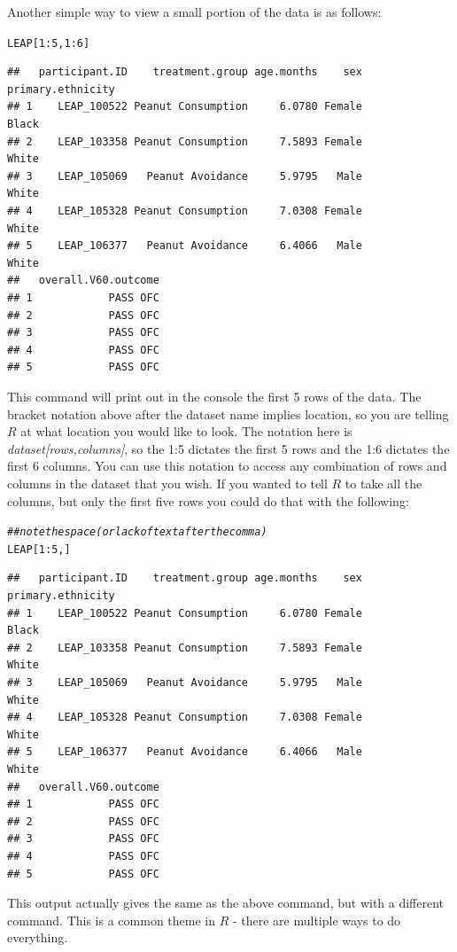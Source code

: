 \documentclass[11pt]{article}\usepackage[]{graphicx}\usepackage[]{color}
\makeatletter
\newcommand{\hlnum}[1]{\textcolor[rgb]{0.686,0.059,0.569}{#1}}%
\newcommand{\hlcom}[1]{\textcolor[rgb]{0.678,0.584,0.686}{\textit{#1}}}%
\newcommand{\hlopt}[1]{\textcolor[rgb]{0,0,0}{#1}}%
\newcommand{\hlstd}[1]{\textcolor[rgb]{0.345,0.345,0.345}{#1}}%
\newenvironment{kframe}{%
 \def\at@end@of@kframe{}%
 \ifinner\ifhmode%
  \def\at@end@of@kframe{\end{minipage}}%
  \begin{minipage}{\columnwidth}%
 \fi\fi%
 \def\FrameCommand##1{\hskip\@totalleftmargin \hskip-\fboxsep
 \colorbox{shadecolor}{##1}\hskip-\fboxsep
     \hskip-\linewidth \hskip-\@totalleftmargin \hskip\columnwidth}%
 \MakeFramed {\advance\hsize-\width
   \@totalleftmargin\z@ \linewidth\hsize
   \@setminipage}}%
 {\par\unskip\endMakeFramed%
 \at@end@of@kframe}
\newenvironment{knitrout}{}{} %
\makeatother
\begin{document}
Another simple way to view a small portion of the data is as follows:
\begin{knitrout}
\color{fgcolor}\begin{kframe}
\begin{alltt}
\hlstd{LEAP[}\hlnum{1}\hlopt{:}\hlnum{5}\hlstd{,}\hlnum{1}\hlopt{:}\hlnum{6}\hlstd{]}
\end{alltt}
\begin{verbatim}
##   participant.ID    treatment.group age.months    sex primary.ethnicity
## 1    LEAP_100522 Peanut Consumption     6.0780 Female             Black
## 2    LEAP_103358 Peanut Consumption     7.5893 Female             White
## 3    LEAP_105069   Peanut Avoidance     5.9795   Male             White
## 4    LEAP_105328 Peanut Consumption     7.0308 Female             White
## 5    LEAP_106377   Peanut Avoidance     6.4066   Male             White
##   overall.V60.outcome
## 1            PASS OFC
## 2            PASS OFC
## 3            PASS OFC
## 4            PASS OFC
## 5            PASS OFC
\end{verbatim}
\end{kframe}
\end{knitrout}
This command will print out in the console the first 5 rows of the data.  The bracket notation above after the dataset name implies location, so you are telling $R$ at what location you would like to look.  The notation here is \textit{dataset[rows,columns]}, so the 1:5 dictates the first 5 rows and the 1:6 dictates the first 6 columns.  You can use this notation to access any combination of rows and columns in the dataset that you wish.  If you wanted to tell $R$ to take all the columns, but only the first five rows you could do that with the following:

\begin{knitrout}
\color{fgcolor}\begin{kframe}
\begin{alltt}
\hlcom{## note the space (or lack of text after the comma)}
\hlstd{LEAP[}\hlnum{1}\hlopt{:}\hlnum{5}\hlstd{, ]}
\end{alltt}
\begin{verbatim}
##   participant.ID    treatment.group age.months    sex primary.ethnicity
## 1    LEAP_100522 Peanut Consumption     6.0780 Female             Black
## 2    LEAP_103358 Peanut Consumption     7.5893 Female             White
## 3    LEAP_105069   Peanut Avoidance     5.9795   Male             White
## 4    LEAP_105328 Peanut Consumption     7.0308 Female             White
## 5    LEAP_106377   Peanut Avoidance     6.4066   Male             White
##   overall.V60.outcome
## 1            PASS OFC
## 2            PASS OFC
## 3            PASS OFC
## 4            PASS OFC
## 5            PASS OFC
\end{verbatim}
\end{kframe}
\end{knitrout}
This output actually gives the same as the above command, but with a different command.  This is a common theme in $R$ - there are multiple ways to do everything.
\end{document}
